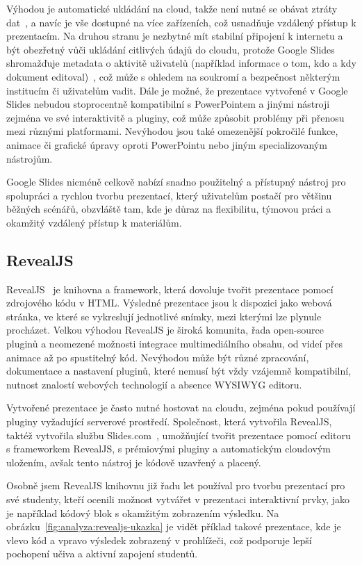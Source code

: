 Výhodou je automatické ukládání na cloud, takže není nutné se obávat ztráty dat~\cite{slides}, a navíc je vše dostupné na více zařízeních, což usnadňuje vzdálený přístup k prezentacím. 
Na druhou stranu je nezbytné mít stabilní připojení k internetu a být obezřetný vůči ukládání citlivých údajů do cloudu, protože Google Slides shromažďuje metadata o aktivitě uživatelů (například informace o tom, kdo a kdy dokument editoval)~\cite{google_terms}, což může s ohledem na soukromí a bezpečnost některým institucím či uživatelům vadit. 
Dále je možné, že prezentace vytvořené v Google Slides nebudou stoprocentně kompatibilní s PowerPointem a jinými nástroji zejména ve své interaktivitě a pluginy, což může způsobit problémy při přenosu mezi různými platformami. 
Nevýhodou jsou také omezenější pokročilé funkce, animace či grafické úpravy oproti PowerPointu nebo jiným specializovaným nástrojům. 

Google Slides nicméně celkově nabízí snadno použitelný a přístupný nástroj pro spolupráci a rychlou tvorbu prezentací, který uživatelům postačí pro většinu běžných scénářů, obzvláště tam, kde je důraz na flexibilitu, týmovou práci a okamžitý vzdálený přístup k materiálům.


\subsection{RevealJS}\label{text:revealjs}

RevealJS~\cite{revealjs} je knihovna a framework, která dovoluje tvořit prezentace pomocí zdrojového kódu v HTML. 
Výsledné prezentace jsou k dispozici jako webová stránka, ve které se vykreslují jednotlivé snímky, mezi kterými lze plynule procházet. 
Velkou výhodou RevealJS je široká komunita, řada open-source pluginů a neomezené možnosti integrace multimediálního obsahu, od videí přes animace až po spustitelný kód. 
Nevýhodou může být různé zpracování, dokumentace a nastavení pluginů, které nemusí být vždy vzájemně kompatibilní, nutnost znalostí webových technologií a absence WYSIWYG editoru. 

Vytvořené prezentace je často nutné hostovat na cloudu, zejména pokud používají pluginy vyžadující serverové prostředí.
Společnost, která vytvořila RevealJS, taktéž vytvořila službu Slides.com~\cite{revealjs, slidescom}, umožňující tvořit prezentace pomocí editoru s frameworkem RevealJS, s prémiovými pluginy a automatickým cloudovým uložením, avšak tento nástroj je kódově uzavřený a placený. 

Osobně jsem RevealJS knihovnu již řadu let používal pro tvorbu prezentací pro své studenty, kteří ocenili možnost vytvářet v prezentaci interaktivní prvky, jako je například kódový blok s okamžitým zobrazením výsledku. 
Na obrázku~\ref{fig:analyza:revealjs-ukazka} je vidět příklad takové prezentace, kde je vlevo kód a vpravo výsledek zobrazený v prohlížeči, což podporuje lepší pochopení učiva a aktivní zapojení studentů. 

